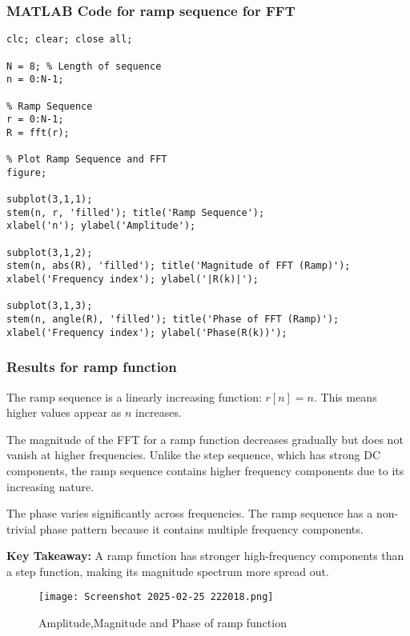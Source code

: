 \documentclass[a4paper,12pt]{article}
\begin{document}
\subsubsection{MATLAB Code for ramp sequence for FFT}

\begin{verbatim}
clc; clear; close all;

N = 8; % Length of sequence
n = 0:N-1;

% Ramp Sequence
r = 0:N-1;
R = fft(r);

% Plot Ramp Sequence and FFT
figure;

subplot(3,1,1);
stem(n, r, 'filled'); title('Ramp Sequence');
xlabel('n'); ylabel('Amplitude');

subplot(3,1,2);
stem(n, abs(R), 'filled'); title('Magnitude of FFT (Ramp)');
xlabel('Frequency index'); ylabel('|R(k)|');

subplot(3,1,3);
stem(n, angle(R), 'filled'); title('Phase of FFT (Ramp)');
xlabel('Frequency index'); ylabel('Phase(R(k))');

\end{verbatim}
\subsubsection{Results for ramp function}
The ramp sequence is a linearly increasing function: \( r[n] = n \). This means higher values appear as \( n \) increases.

The magnitude of the FFT for a ramp function decreases gradually but does not vanish at higher frequencies. Unlike the step sequence, which has strong DC components, the ramp sequence contains higher frequency components due to its increasing nature.

The phase varies significantly across frequencies. The ramp sequence has a non-trivial phase pattern because it contains multiple frequency components.

\textbf{Key Takeaway:} A ramp function has stronger high-frequency components than a step function, making its magnitude spectrum more spread out.

\begin{figure}[h]
    \centering
    \texttt{[image: Screenshot 2025-02-25 222018.png]}
    \caption{Amplitude,Magnitude and Phase of ramp function}
    \label{fig:impulse_fft_result}
\end{figure}
\end{document}
